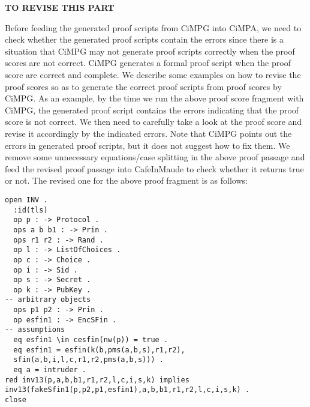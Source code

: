 \documentclass[a4paper,fleqn]{cas-dc}
\begin{document}
\textbf{TO REVISE THIS PART}






Before feeding the generated proof scripts from CiMPG into CiMPA, we need to check whether the generated proof scripts contain the errors since there is a situation that CiMPG may not generate proof scripts correctly when the proof scores are not correct. CiMPG generates a formal proof script when the proof score are correct and complete. We describe some examples on how to revise the proof scores so as to generate the correct proof scripts from proof scores by CiMPG. As an example, by the time we run the above proof score fragment with CiMPG, the generated proof script contains the errors indicating that the proof score is not correct. We then need to carefully take a look at the proof score and revise it accordingly by the indicated errors. Note that CiMPG points out the errors in generated proof scripts, but it does not suggest how to fix them. We remove some unnecessary equations/case splitting in the above proof passage and feed the revised proof passage into CafeInMaude to check whether it returns true or not. The revised one for the above proof fragment is as follows:
\begin{small}
\begin{verbatim}
open INV .
  :id(tls)
  op p : -> Protocol .
  ops a b b1 : -> Prin .
  ops r1 r2 : -> Rand .
  op l : -> ListOfChoices .
  op c : -> Choice .
  op i : -> Sid .
  op s : -> Secret .
  op k : -> PubKey .
-- arbitrary objects
  ops p1 p2 : -> Prin .
  op esfin1 : -> EncSFin .
-- assumptions
  eq esfin1 \in cesfin(nw(p)) = true .
  eq esfin1 = esfin(k(b,pms(a,b,s),r1,r2),
  sfin(a,b,i,l,c,r1,r2,pms(a,b,s))) .
  eq a = intruder .
red inv13(p,a,b,b1,r1,r2,l,c,i,s,k) implies
inv13(fakeSfin1(p,p2,p1,esfin1),a,b,b1,r1,r2,l,c,i,s,k) .
close
\end{verbatim}
\end{small}
\end{document}
